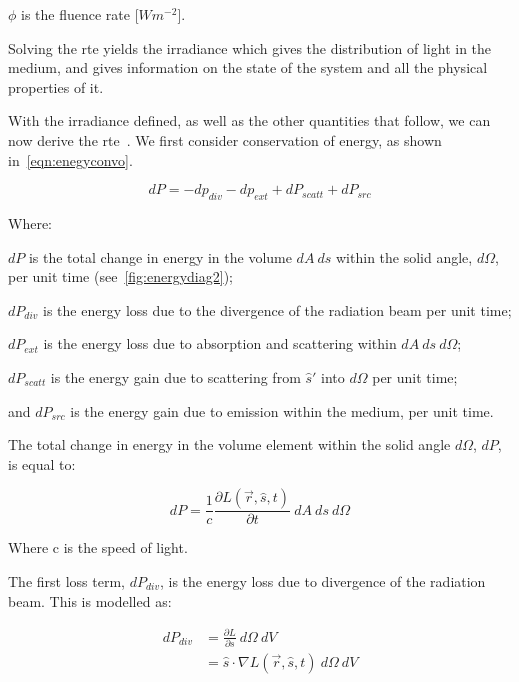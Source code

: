 \indent $\phi$ is the fluence rate [$W m^{-2}$].

\medskip

Solving the \gls*{rte} yields the irradiance which gives the distribution of light in the medium, and gives information on the state of the system and all the physical properties of it.

With the irradiance defined, as well as the other quantities that follow, we can now derive the \gls*{rte}~\cite{chandrasekhar2013radiative,wang2012biomedical}. We first consider conservation of energy, as shown in~\cref{eqn:enegyconvo}.

\begin{equation}
	dP = -dp_{div} - dp_{ext} + dP_{scatt} + dP_{src}
	\label{eqn:enegyconvo}
\end{equation}

\noindent Where:

\indent $dP$ is the total change in energy in the volume $dA\ ds$ within the solid angle, $d\Omega$, per unit time (see~\cref{fig:energydiag2});

\indent $dP_{div}$ is the energy loss due to the divergence of the radiation beam per unit time;

\indent $dP_{ext}$ is the energy loss due to absorption and scattering within $dA\ ds\ d\Omega$;

\indent $dP_{scatt}$ is the energy gain due to scattering from $\hat{s}'$ into $d\Omega$ per unit time;

\indent and $dP_{src}$ is the energy gain due to emission within the medium, per unit time.

\medskip

The total change in energy in the volume element within the solid angle $d\Omega$, $dP$, is equal to:

\begin{equation}
	dP=\frac{1}{c}\frac{\partial L(\vec{r},\hat{s},t)}{\partial t}\ dA\ ds\ d\Omega
	\label{eqn:p}
\end{equation}

\noindent Where c is the speed of light.

\medskip

The first loss term, $dP_{div}$, is the energy loss due to divergence of the radiation beam. This is modelled as:

\begin{align}
	dP_{div}&=\frac{\partial L}{\partial s}\ d\Omega\ dV \\
		    &=\hat{s} \cdot \nabla L(\vec{r},\hat{s},t)\ d\Omega\ dV
    \label{eqn:pdiv}
\end{align}

